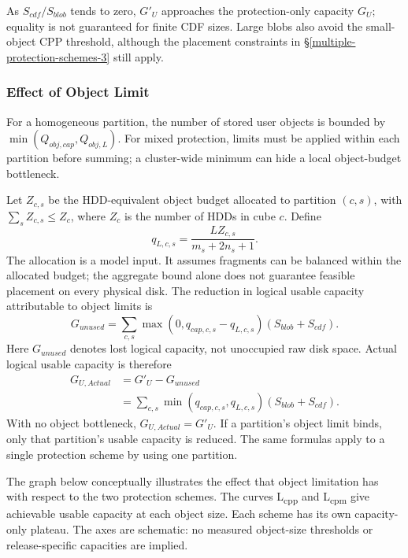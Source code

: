 As \(S_{cdf}/S_{blob}\) tends to zero, \(G'_U\) approaches the
protection-only capacity \(G_U\); equality is not guaranteed for finite CDF
sizes. Large blobs also avoid the small-object CPP threshold, although the
placement constraints in §\ref{multiple-protection-schemes-3} still apply.

\subsubsection*{Effect of Object Limit}

For a homogeneous partition, the number of stored user objects is bounded
by \(\min(Q_{obj,cap},Q_{obj,L})\). For mixed protection, limits must be
applied within each partition before summing; a cluster-wide minimum can
hide a local object-budget bottleneck.

Let \(Z_{c,s}\) be the HDD-equivalent object budget allocated to partition
\((c,s)\), with \(\sum_s Z_{c,s}\leq Z_c\), where \(Z_c\) is the number of
HDDs in cube \(c\). Define
\[
q_{L,c,s}=\frac{L Z_{c,s}}{m_s+2n_s+1}.
\]
The allocation is a model input. It assumes fragments can be balanced
within the allocated budget; the aggregate bound alone does not guarantee
feasible placement on every physical disk. The reduction in logical usable
capacity attributable to object limits is
\begin{equation}\label{eq:20}
G_{unused}=\sum_{c,s}\max(0,q_{cap,c,s}-q_{L,c,s})(S_{blob}+S_{cdf}).
\end{equation}
Here \(G_{unused}\) denotes lost logical capacity, not unoccupied raw disk
space. Actual logical usable capacity is therefore
\begin{equation}\label{eq:21}
\begin{aligned}
G_{U,Actual}&=G'_U-G_{unused}\\
&=\sum_{c,s}\min(q_{cap,c,s},q_{L,c,s})(S_{blob}+S_{cdf}).
\end{aligned}
\end{equation}
With no object bottleneck, \(G_{U,Actual}=G'_U\). If a partition's object
limit binds, only that partition's usable capacity is reduced. The same
formulas apply to a single protection scheme by using one partition.

The graph below conceptually illustrates the effect that object limitation has with respect to the two protection schemes. The curves L\textsubscript{cpp} and L\textsubscript{cpm} give achievable usable capacity at each object size. Each scheme has its own capacity-only plateau. The axes are schematic: no measured object-size thresholds or release-specific capacities are implied.


